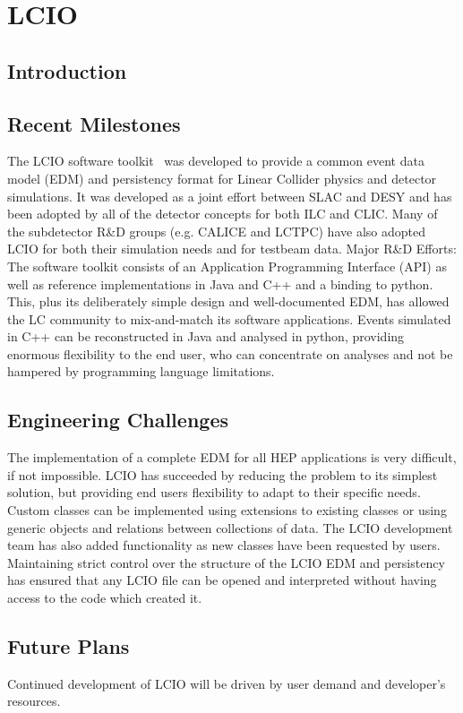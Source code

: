 \section{LCIO}

\subsection{Introduction}

\subsection{Recent Milestones}
The LCIO software toolkit~\cite{lcioWebsite} was developed to provide a common event data model
(EDM) and persistency format for Linear Collider physics and detector
simulations. It was developed as a joint effort between SLAC and DESY and has
been adopted by all of the detector concepts for both ILC and CLIC. Many of
the subdetector R\&D groups (e.g. CALICE and LCTPC) have also adopted LCIO for
both their simulation needs and for testbeam data. Major R\&D Efforts: The
software toolkit consists of an Application Programming Interface (API) as well
as reference implementations in Java and C++ and a binding to python. This, plus
its deliberately simple design and well-documented EDM, has allowed the LC
community to mix-and-match its software applications. Events simulated in C++
can be reconstructed in Java and analysed in python, providing enormous
flexibility to the end user, who can concentrate on analyses and not be hampered
by programming language limitations.

\subsection{Engineering Challenges}
The implementation of a complete EDM for all HEP applications is very difficult,
if not impossible. LCIO has succeeded by reducing the problem to its simplest
solution, but providing end users flexibility to adapt to their specific needs.
Custom classes can be implemented using extensions to existing classes or using
generic objects and relations between collections of data. The LCIO development
team has also added functionality as new classes have been requested by users.
Maintaining strict control over the structure of the LCIO EDM and persistency
has ensured that any LCIO file can be opened and interpreted without having
access to the code which created it.

\subsection{Future Plans}
Continued development of LCIO will be driven by user demand and developer’s resources.


